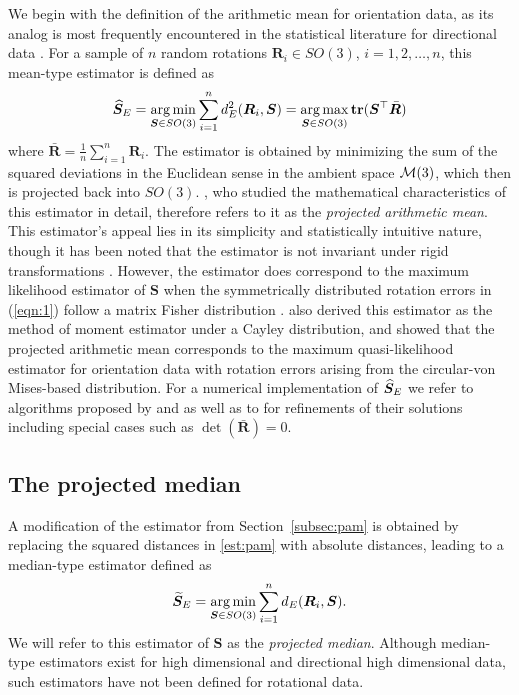 We begin with the definition of the arithmetic mean for orientation data, as its analog is most frequently encountered in the statistical literature for directional data \citep[e.g.,~see][]{mardia00}.   For a sample of $n$ random rotations $\bm{R}_i\in SO(3)$, $i=1,2,\dots,n$, this mean-type estimator is defined as
\begin{equation}\label{est:pam}
{\widehat{\bm S}_E}=\operatorname*{arg\,min}_{\bm{S}\in
SO(3)}\sum_{i=1}^n d^2_E(\bm{R}_i,\bm{S})=\operatorname*{arg\,max}_{\bm{S}\in
SO(3)}{\mathbf{tr}}(\bm{S}^{\top}\bar{\bm{R}})
\end{equation}
where $\bar{\bm{R}}=\frac{1}{n}\sum_{i=1}^n\bm{R}_i$. The estimator is obtained by minimizing the sum of the squared deviations in the Euclidean sense in the ambient space $\mathcal{M}(3)$, which then is projected back into $SO(3)$. \citet{moakher02}, who studied the mathematical characteristics of this estimator in detail, therefore refers to it as the \textit{projected arithmetic mean}.    This estimator's appeal lies in its simplicity and statistically intuitive nature, though it has been noted that the estimator is not invariant under rigid transformations \citep[see][]{moakher02}.  However, the estimator does correspond to the maximum likelihood estimator of $\bm{S}$ when the symmetrically distributed rotation errors in (\ref{eqn:1}) follow a matrix Fisher distribution \citep{jupp79}.  \citet{leon06} also derived this estimator as the method of moment estimator under a Cayley  distribution, and \citet{bingham09} showed that the projected arithmetic mean corresponds to the maximum quasi-likelihood estimator for orientation data with rotation errors arising from the circular-von Mises-based distribution.  For a numerical implementation of ${\widehat{\bm S}_E}$ we refer to algorithms proposed by \citet{arun87} and \citet{horn88} as well as to \citet{umeyama91} for refinements of their solutions including special cases such as $\det(\bar{\bm R})=0$.

\subsection{The projected median}
\label{subsec:med}

A modification of the estimator from Section~\ref{subsec:pam} is obtained by replacing the squared distances in \eqref{est:pam} with absolute distances, leading to a median-type estimator defined as
\begin{equation}\label{est:med}
{\widetilde{\bm S}_E}=\operatorname*{arg\,min}_{\bm{S}\in
SO(3)}\sum_{i=1}^n{d_E}(\bm{R}_i,\bm{S}).
\end{equation}
We will refer to this estimator of $\bm{S}$ as the \textit{projected median}.  %
Although median-type estimators exist for high dimensional and directional  high dimensional  data, such estimators have not been defined for rotational data. 

